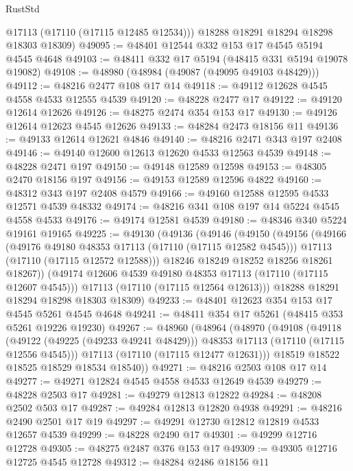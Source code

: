 \begin{lexlean}{RustStd}
\begin{coremodule}
        @17113
        (@17110 (@17115 @12485 @12534)))
      @18288
      @18291
      @18294
      @18298
      @18303
      @18309)
@49095 := @48401 @12544 @332 @153 @17 @4545 @5194 @4545 @4648
@49103 := @48411 @332 @17 @5194 (@48415 @331 @5194 @19078 @19082)
@49108 := @48980 (@48984 (@49087 (@49095 @49103 @48429)))
@49112 := @48216 @2477 @108 @17 @14
@49118 := @49112 @12628 @4545 @4558 @4533 @12555 @4539
@49120 := @48228 @2477 @17
@49122 := @49120 @12614 @12626
@49126 := @48275 @2474 @354 @153 @17
@49130 := @49126 @12614 @12623 @4545 @12626
@49133 := @48284 @2473 @18156 @11
@49136 := @49133 @12614 @12621 @4846
@49140 := @48216 @2471 @343 @197 @2408
@49146 := @49140 @12600 @12613 @12620 @4533 @12563 @4539
@49148 := @48228 @2471 @197
@49150 := @49148 @12589 @12598
@49153 := @48305 @2470 @18156 @197
@49156 := @49153 @12589 @12596 @4822
@49160 := @48312 @343 @197 @2408 @4579
@49166 := @49160 @12588 @12595 @4533 @12571 @4539 @48332
@49174 := @48216 @341 @108 @197 @14 @5224 @4545 @4558 @4533
@49176 := @49174 @12581 @4539
@49180 := @48346 @340 @5224 @19161 @19165
@49225 := @49130
    (@49136
      (@49146
        (@49150
          (@49156
            (@49166
              (@49176 @49180 @48353 @17113 (@17110 (@17115 @12582 @4545)))
              @17113
              (@17110 (@17115 @12572 @12588)))
            @18246
            @18249
            @18252
            @18256
            @18261
            @18267))
        (@49174 @12606 @4539 @49180 @48353 @17113 (@17110 (@17115 @12607 @4545)))
        @17113
        (@17110 (@17115 @12564 @12613)))
      @18288
      @18291
      @18294
      @18298
      @18303
      @18309)
@49233 := @48401 @12623 @354 @153 @17 @4545 @5261 @4545 @4648
@49241 := @48411 @354 @17 @5261 (@48415 @353 @5261 @19226 @19230)
@49267 := @48960
    (@48964
      (@48970
        (@49108
          (@49118
            (@49122 (@49225 (@49233 @49241 @48429)))
            @48353
            @17113
            (@17110 (@17115 @12556 @4545)))
          @17113
          (@17110 (@17115 @12477 @12631)))
        @18519
        @18522
        @18525
        @18529
        @18534
        @18540))
@49271 := @48216 @2503 @108 @17 @14
@49277 := @49271 @12824 @4545 @4558 @4533 @12649 @4539
@49279 := @48228 @2503 @17
@49281 := @49279 @12813 @12822
@49284 := @48208 @2502 @503 @17
@49287 := @49284 @12813 @12820 @4938
@49291 := @48216 @2490 @2501 @17 @19
@49297 := @49291 @12730 @12812 @12819 @4533 @12657 @4539
@49299 := @48228 @2490 @17
@49301 := @49299 @12716 @12728
@49305 := @48275 @2487 @376 @153 @17
@49309 := @49305 @12716 @12725 @4545 @12728
@49312 := @48284 @2486 @18156 @11

\end{coremodule}
\end{lexlean}
